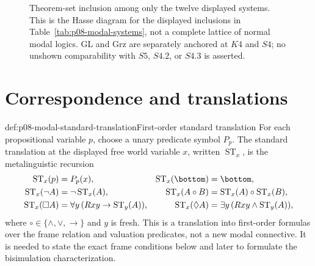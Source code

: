 
\begin{figure}[!htbp]
\centering
{}
\caption{Theorem-set inclusion among only the twelve displayed systems.  This
is the Hasse diagram for the displayed inclusions in
Table~\ref{tab:p08-modal-systems}, not a complete lattice of normal modal
logics.  GL and Grz are separately anchored at \(K4\) and \(S4\); no unshown
comparability with \(S5\), \(S4.2\), or \(S4.3\) is asserted.}
\label{fig:p08-modal-lattice}
\end{figure}

\section{Correspondence and translations}

\begin{hbdefinition}{def:p08-modal-standard-translation}{First-order standard translation}
For each propositional variable \(p\), choose a unary predicate symbol
\(P_p\).  The standard translation at the displayed free world variable
\(x\), written \(\operatorname{ST}_x\), is the metalinguistic recursion
\[
\begin{aligned}
 \operatorname{ST}_x(p)&=P_p(x),
 &\operatorname{ST}_x(\bottom)&=\bottom,\\
 \operatorname{ST}_x(\neg A)&=\neg\operatorname{ST}_x(A),
 &\operatorname{ST}_x(A\circ B)&=
   \operatorname{ST}_x(A)\circ\operatorname{ST}_x(B),\\
 \operatorname{ST}_x(\Box A)&=
   \forall y\,(Rxy\to\operatorname{ST}_y(A)),
 &\operatorname{ST}_x(\Diamond A)&=
   \exists y\,(Rxy\land\operatorname{ST}_y(A)),
\end{aligned}
\]
where \(\circ\in\{\land,\lor,\to\}\) and \(y\) is fresh.  This is a
translation into first-order formulas over the frame relation and valuation
predicates, not a new modal connective.  It is needed to state the exact frame
conditions below and later to formulate the bisimulation characterization.
\end{hbdefinition}


